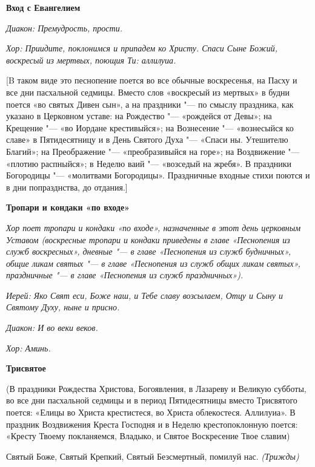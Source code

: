 \medskip\bfseries Вход с Евангелием \normalfont{}\nopagebreak


\itshape Диакон:\normalfont{} Премудрость, прости.


\itshape  Хор:\normalfont{} Приидите, поклонимся и припадем ко Христу. Спаси Сыне Божий, воскресый из мертвых, поющия Ти: аллилуиа.


[B таком виде это песнопение поется во все обычные воскресенья, на Пасху и все дни пасхальной седмицы. Вместо слов «воскресый из мертвых» в будни поется «во святых Дивен сын», а на праздники "--- по смыслу праздника, как указано в Церковном уставе: на Рождество "--- «рождейся от Девы»; на Крещение "--- «во Иордане крестивыйся»; на Вознесение "--- «вознесыйся ко славе» в Пятидесятницу и в День Святого Духа "--- «Спаси ны. Утешителю Благий»; на Преображение "--- «преобразивыйся на горе»; на Воздвижение "--- «плотию распныйся»; в Неделю ваий "--- «возседый на жребя». В праздники Богородицы "--- «молитвами Богородицы». Праздничные входные стихи поются и в дни попразднства, до отдания.]


\medskip\bfseries Тропари и кондаки «по входе» \normalfont{}\nopagebreak


\itshape Хор поет тропари и кондаки «по входе», назначенные в этот день церковным Уставом (воскресные тропари и кондаки приведены в главе «Песнопения из служб воскресных», дневные "--- в главе «Песнопения из служб будничных», общие ликам святых "--- в главе «Песнопения из служб общих ликам святых», праздничные "--- в главе «Песнопения из служб праздничных»).\normalfont{}


\itshape Иерей:\normalfont{} Яко Свят еси, Боже наш, и Тебе славу возсылаем, Отцу и Сыну и Святому Духу, ныне и присно.


\itshape Диакон:\normalfont{} И во веки веков.


\itshape Хор:\normalfont{} Аминь.




\medskip\bfseries Трисвятое \normalfont{}\nopagebreak


(В праздники Рождества Христова, Богоявления, в Лазареву и Великую субботы, во все дни пасхальной седмицы и в период Пятидесятницы вместо Трисвятого поется: «Елицы во Христа крестистеся, во Христа облекостеся. Аллилуиа». В праздник Воздвижения Креста Господня и в Неделю крестопоклонную поется: «Кресту Твоему покланяемся, Владыко, и Святое Воскресение Твое славим)


Святый Боже, Святый Крепкий, Святый Безсмертный, помилуй нас. \itshape (Трижды)\normalfont{}


